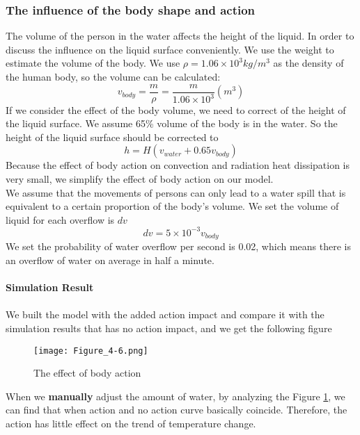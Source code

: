 \documentclass{mcmthesis}
\begin{document}
\subsubsection{The influence of the body shape and action}
The volume of the person in the water affects the height of the liquid. In order to discuss the influence on the liquid surface conveniently. We use the weight to estimate the volume of the body. We use $\rho =1.06\times10^{3}kg/m^{3}$ as the density of the human body, so the volume can be calculated:
\begin{equation}
v_{body}=\frac{m}{\rho }=\frac{m}{1.06\times 10^{3}}(m^{3})
\end{equation}
\indent If we consider the effect of the body volume, we need to correct of the height of the liquid surface. We assume 65\% volume of the body is in the water. So the height of the liquid surface should be corrected to\\
\begin{equation}
	h=H(v_{water}+0.65v_{body})
\end{equation}
\indent Because the effect of body action on convection and radiation heat dissipation is very small, we simplify the effect of body action on our model.\\
\indent We assume that the movements of persons can only lead to a water spill that is equivalent to a certain proportion of the body's volume. We set the volume of liquid for each overflow is $dv$
\begin{equation}
	dv=5\times10^{-3}v_{body}
\end{equation}\indent We set the probability of water overflow per second is 0.02, which means there is an overflow of water on average in half a minute.\\\\
\noindent
\textbf{Simulation Result}\\\\
\indent We built the model with the added action impact and compare it with the simulation results that has no action impact, and we get the following figure
\begin{figure}[H]
	\centerline{\texttt{[image: Figure\_4-6.png]}}
	\caption{The effect of body action}
	\label{action}	
\end{figure}

When we \textbf{manually} adjust the amount of water, by analyzing the Figure \ref{action}, we can find that when action and no action curve basically coincide. Therefore, the action has little effect on the trend of temperature change.\\
\end{document}
